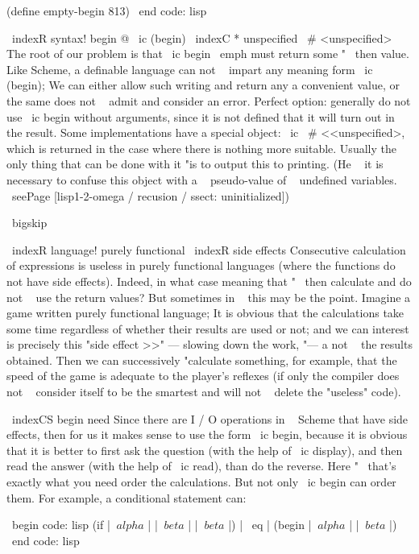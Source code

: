 {(define empty-begin 813)
\ end {code: lisp}

\ indexR {syntax! begin @ \ ic {(begin)}}
\ indexC * {unspecified} { \ # <unspecified>}
The root of our problem is that \ ic {begin} \ emph {must} return some "~ then
value. Like Scheme, a definable language can not ~ impart any meaning
form \ ic {(begin)}; We can either allow such writing and return any
a convenient value, or ~ the same does not ~ admit and consider an error. Perfect option:
generally do not use \ ic {begin} without arguments, since it is not defined that
it will turn out in the result. Some implementations have a special object:
\ ic { \ # <<unspecified>}, which is returned in the case where there is nothing more
suitable. Usually the only thing that can be done with it "is to output this to
printing. (He ~ it is necessary to confuse this object with a ~ pseudo-value of ~ undefined
variables. \ seePage [lisp1-2-omega / recusion / ssect: uninitialized])

\ bigskip

\ indexR {language! purely functional}
\ indexR {side effects}
Consecutive calculation of expressions is useless in purely functional languages
(where the functions do not have side effects). Indeed, in what case
meaning that "~ then calculate and do not ~ use the return values? But sometimes
in ~ this may be the point. Imagine a game written purely
functional language; It is obvious that the calculations take some time
regardless of whether their results are used or not; and we can
interest is precisely this "side effect >>" --- slowing down the work, "--- a
not ~ the results obtained. Then we can successively "calculate something,
for example, that the speed of the game is adequate to the player's reflexes (if only
the compiler does not ~ consider itself to be the smartest and will not ~ delete the "useless" code).

\ indexCS {begin} {need}
Since there are I / O operations in ~ Scheme that have side effects, then
for us it makes sense to use the form \ ic {begin}, because it is obvious that
it is better to first ask the question (with the help of \ ic {display}), and then read the answer
(with the help of \ ic {read}), than do the reverse. Here "~ that's exactly what you need
order the calculations. But not only \ ic {begin} can order them.
For example, a conditional statement can:

\ begin {code: lisp}
(if | $ \ alpha $ | | $ \ beta $ | | $ \ beta $ |) | \ eq | (begin | $ \ alpha $ | | $ \ beta $ |)
\ end {code: lisp}

}
